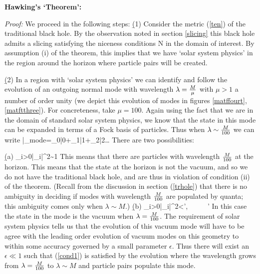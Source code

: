 \documentclass[12pt]{article}
\begin{document}
{\bf Hawking's `Theorem':}

\b
\b

{\it Proof:} \quad We proceed in the following steps:
\b


(1) Consider the metric (\ref{ten}) of the traditional black hole. By the observation noted in section  \ref{slicing} this black hole admits a slicing satisfying the niceness conditions N in the domain of interest. By assumption (i) of the theorem, this implies that we have `solar system physics' in the region around the horizon where particle pairs will be created.

\b



(2)  In a region with `solar system physics' we can identify and follow the evolution of an outgoing normal mode with wavelength $\lambda={M\over \mu}$ with $\mu>1$ a number of order unity (we depict this evolution of modes in figures \ref{matffourt},\ref{matftthree}). For concreteness, take $\mu=100$. Again using the fact that we are in the domain of standard solar system physics, we know that the state in this mode can be expanded in terms of  a Fock basis of particles. Thus when   $\lambda\sim {M\over 100}$ we can write
\be
|\psi\rangle_{mode}=\alpha_0|0\rangle+\alpha_1|1\rangle+\alpha_2|2\rangle\dots
\ee
There are two possibilities:

\b

(a) 
\be
\sum_{i>0}|\alpha_i|^2\sim 1
\ee
This means that there are particles with wavelength ${M\over 100}$ at the horizon. This means that the state at the horizon is not the vacuum, and so we do not have the traditional black hole, and are thus in violation of condition (ii) of the theorem. (Recall from the discussion in section (\ref{trhole}) that there is no ambiguity  in deciding if modes with wavelength ${M\over 100}$ are populated by quanta; this ambiguity comes only when $\lambda\sim M$.)
\b

(b) 
\be
\sum_{i>0}|\alpha_i|^2<\epsilon',~~ ~~~\epsilon'
\label{bound}
\ee
In this case the state in the mode is the vacuum when $\lambda={M\over 100}$. The requirement of solar system physics tells us that the evolution of this vacuum mode will have to be agree with the leading order evolution of vacuum modes on this geometry to within some accuracy governed by a small parameter $\epsilon$. Thus there will exist an $\epsilon\ll 1$ such that  (\ref{cond1}) is satisfied by the evolution where the wavelength grows from $\lambda={M\over 100}$ to $\lambda\sim M$ and particle pairs populate this mode.
\end{document}
